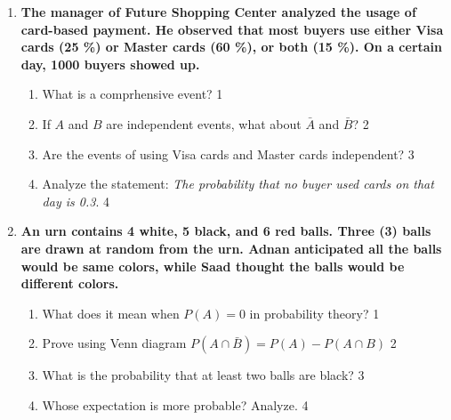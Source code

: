 \documentclass[12pt]{article}
\begin{document}
  \begin{enumerate}
  
   \item
	  \textbf{The manager of Future Shopping Center analyzed the usage of card-based payment. He observed that most buyers use either Visa cards (25 \%) or Master cards (60 \%), or both (15 \%). On a certain day, 1000 buyers showed up.} 
  
  \begin{enumerate}
  
  \item What is a comprhensive event? \hfill 1
 \item If $A$ and $B$ are independent events, what about $\bar A$ and $\bar B$? \hfill 2 
    \item  
	Are the events of using Visa cards and Master cards independent? \hfill 3
    \item
	Analyze the statement: \textit{The probability that no buyer used cards on that day is 0.3}. \hfill 4
  \end{enumerate}


 \item
	  \textbf{An urn contains 4 white, 5 black, and 6 red balls. Three (3) balls are drawn at random from the urn. Adnan anticipated all the balls would be same colors, while Saad thought the balls would be different colors.} 
  
  \begin{enumerate}
    \item What does it mean when \( P(A) = 0 \) in probability theory? \hfill 1
    \item Prove using Venn diagram $P(A\cap \bar B) = P(A) - P(A\cap B)$ \hfill 2
    \item  
	What is the probability that at least two balls are black? \hfill 3
    \item
	Whose expectation is more probable? Analyze.  \hfill 4
  \end{enumerate}

\end{enumerate}
\end{document}
